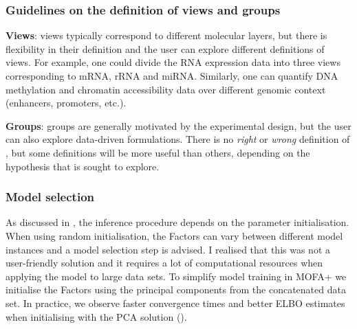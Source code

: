 \subsubsection{Guidelines on the definition of views and groups} \label{section:mofa2_guidelines_views_groups}

\textbf{Views}: views typically correspond to different molecular layers, but there is flexibility in their definition and the user can explore different definitions of views. For example, one could divide the RNA expression data into three views corresponding to mRNA, rRNA and miRNA. Similarly, one can quantify DNA methylation and chromatin accessibility data over different genomic context (enhancers, promoters, etc.).

\textbf{Groups}: groups are generally motivated by the experimental design, but the user can also explore data-driven formulations. There is no \textit{right} or \textit{wrong} definition of , but some definitions will be more useful than others, depending on the hypothesis that is sought to explore.


\subsubsection{Model selection} \label{section:mofa2_model_selection}

As discussed in , the inference procedure depends on the parameter initialisation. When using random initialisation, the Factors can vary between different model instances and a model selection step is advised. I realised that this was not a user-friendly solution and it requires a lot of computational resources when applying the model to large data sets. To simplify model training in MOFA+ we initialise the Factors using the principal components from the concatenated data set. In practice, we observe faster convergence times and better ELBO estimates when initialising with the PCA solution ().

